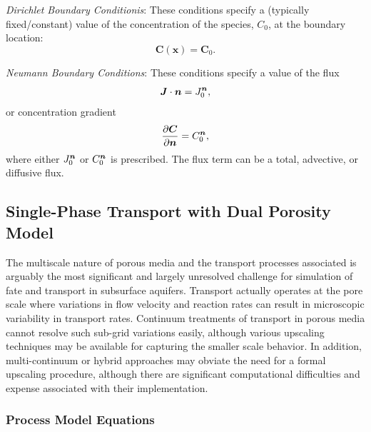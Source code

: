 \noindent \textit{Dirichlet Boundary Conditionis}:  
These conditions specify a (typically fixed/constant) value of the concentration of the species, $C_0$, 
at the boundary location:
\begin{equation}\label{eq:transport Dirichlet}
  \boldsymbol{C}(\boldsymbol{x})=\boldsymbol{C}_{0} .
\end{equation}

\textit{Neumann Boundary Conditions}:  
These conditions specify a value of the flux
\begin{equation}\label{eq:transport Neuman flux} 
  \boldsymbol{J}\cdot \boldsymbol{n} = J_0^{\boldsymbol{n}},
\end{equation}
or concentration gradient
\begin{equation}\label{eq:transport Neuman gradient}
  \frac{\partial \boldsymbol{C}}{\partial \boldsymbol{n}} = C_0^{\boldsymbol{n}},
\end{equation}
where either $J_0^{\boldsymbol{n}}$ or $C_0^{\boldsymbol{n}}$ is prescribed. 
The flux term can be a total, advective, or diffusive flux.



\clearpage


\subsection{Single-Phase Transport with Dual Porosity Model} 
\label{sec:transport-single-phase-dual-porosity}

The multiscale nature of porous media and the transport processes associated is 
arguably the most significant and largely unresolved challenge for simulation of 
fate and transport in subsurface aquifers.  
Transport actually operates at the pore scale where variations in flow velocity 
and reaction rates can result in microscopic variability in transport rates.  
Continuum treatments of transport in porous media cannot resolve such sub-grid 
variations easily, although various upscaling techniques may be available for 
capturing the smaller scale behavior.  
In addition, multi-continuum or hybrid approaches may obviate the need for a formal 
upscaling procedure, although there are significant computational difficulties and 
expense associated with their implementation.


\subsubsection{Process Model Equations} 

